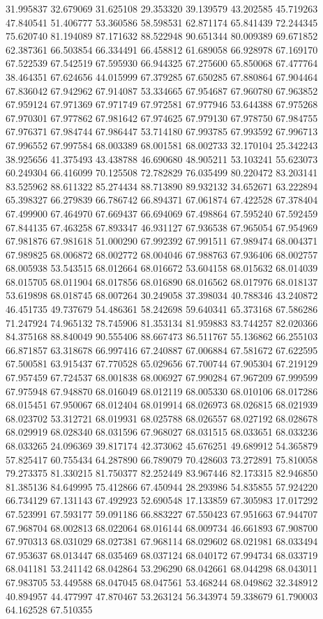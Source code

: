 31.995837
32.679069
31.625108
29.353320
39.139579
43.202585
45.719263
47.840541
51.406777
53.360586
58.598531
62.871174
65.841439
72.244345
75.620740
81.194089
87.171632
88.522948
90.651344
80.009389
69.671852
62.387361
66.503854
66.334491
66.458812
61.689058
66.928978
67.169170
67.522539
67.542519
67.595930
66.944325
67.275600
65.850068
67.477764
38.464351
67.624656
44.015999
67.379285
67.650285
67.880864
67.904464
67.836042
67.942962
67.914087
53.334665
67.954687
67.960780
67.963852
67.959124
67.971369
67.971749
67.972581
67.977946
53.644388
67.975268
67.970301
67.977862
67.981642
67.974625
67.979130
67.978750
67.984755
67.976371
67.984744
67.986447
53.714180
67.993785
67.993592
67.996713
67.996552
67.997584
68.003389
68.001581
68.002733
32.170104
25.342243
38.925656
41.375493
43.438788
46.690680
48.905211
53.103241
55.623073
60.249304
66.416099
70.125508
72.782829
76.035499
80.220472
83.203141
83.525962
88.611322
85.274434
88.713890
89.932132
34.652671
63.222894
65.398327
66.279839
66.786742
66.894371
67.061874
67.422528
67.378404
67.499900
67.464970
67.669437
66.694069
67.498864
67.595240
67.592459
67.844135
67.463258
67.893347
46.931127
67.936538
67.965054
67.954969
67.981876
67.981618
51.000290
67.992392
67.991511
67.989474
68.004371
67.989825
68.006872
68.002772
68.004046
67.988763
67.936406
68.002757
68.005938
53.543515
68.012664
68.016672
53.604158
68.015632
68.014039
68.015705
68.011904
68.017856
68.016890
68.016562
68.017976
68.018137
53.619898
68.018745
68.007264
30.249058
37.398034
40.788346
43.240872
46.451735
49.737679
54.486361
58.242698
59.640341
65.373168
67.586286
71.247924
74.965132
78.745906
81.353134
81.959883
83.744257
82.020366
84.375168
88.840049
90.555406
88.667473
86.511767
55.136862
66.255103
66.871857
63.318678
66.997416
67.240887
67.006884
67.581672
67.622595
67.500581
63.915437
67.770528
65.029656
67.700744
67.905304
67.219129
67.957459
67.724537
68.001838
68.006927
67.990284
67.967209
67.999599
67.975948
67.948870
68.016049
68.012119
68.005330
68.010106
68.017286
68.015451
67.950067
68.012404
68.019914
68.026973
68.026815
68.021939
68.023702
53.312721
68.019931
68.025788
68.026557
68.027192
68.028678
68.029919
68.028340
68.031596
67.968027
68.031515
68.033651
68.033236
68.033265
24.096369
39.817174
42.373062
45.676251
49.689912
54.365879
57.825417
60.755434
64.287890
66.789079
70.428603
73.272891
75.810058
79.273375
81.330215
81.750377
82.252449
83.967446
82.173315
82.946850
81.385136
84.649995
75.412866
67.450944
28.293986
54.835855
57.924220
66.734129
67.131143
67.492923
52.690548
17.133859
67.305983
17.017292
67.523991
67.593177
59.091186
66.883227
67.550423
67.951663
67.944707
67.968704
68.002813
68.022064
68.016144
68.009734
46.661893
67.908700
67.970313
68.031029
68.027381
67.968114
68.029602
68.021981
68.033494
67.953637
68.013447
68.035469
68.037124
68.040172
67.994734
68.033719
68.041181
53.241142
68.042864
53.296290
68.042661
68.044298
68.043011
67.983705
53.449588
68.047045
68.047561
53.468244
68.049862
32.348912
40.894957
44.477997
47.870467
53.263124
56.343974
59.338679
61.790003
64.162528
67.510355
